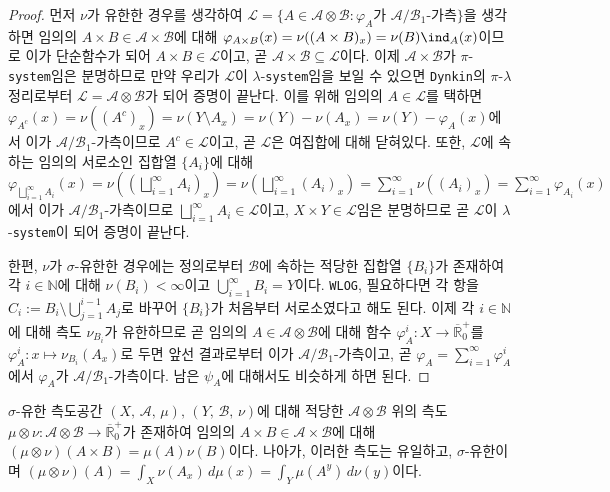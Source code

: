 \begin{proof}
    먼저 $\nu$가 유한한 경우를 생각하여 $\mathcal{L}=\{A\in\mathcal{A}\otimes\mathcal{B}:\varphi_A\textrm{가 $\mathcal{A}/\mathcal{B}_1$-가측}\}$을 생각하면 임의의 $A\times B\in\mathcal{A}\times\mathcal{B}$에 대해 $\varphi_{A\times B}(x)=\nu((A\times B)_x)=\nu(B)\ind_A(x)$이므로 이가 단순함수가 되어 $A\times B\in\mathcal{L}$이고, 곧 $\mathcal{A}\times\mathcal{B}\subseteq\mathcal{L}$이다. 이제 $\mathcal{A}\times\mathcal{B}$가 $\pi$-\texttt{system}임은 분명하므로 만약 우리가 $\mathcal{L}$이 $\lambda$-\texttt{system}임을 보일 수 있으면 \texttt{Dynkin}의 $\pi$-$\lambda$ 정리로부터 $\mathcal{L}=\mathcal{A}\otimes\mathcal{B}$가 되어 증명이 끝난다. 이를 위해 임의의 $A\in\mathcal{L}$를 택하면 $\varphi_{A^c}(x)=\nu((A^c)_x)=\nu(Y\setminus A_x)=\nu(Y)-\nu(A_x)=\nu(Y)-\varphi_A(x)$에서 이가 $\mathcal{A}/\mathcal{B}_1$-가측이므로 $A^c\in\mathcal{L}$이고, 곧 $\mathcal{L}$은 여집합에 대해 닫혀있다. 또한, $\mathcal{L}$에 속하는 임의의 서로소인 집합열 $\{A_i\}$에 대해 $\varphi_{\bigsqcup_{i=1}^\infty A_i}(x)=\nu((\bigsqcup_{i=1}^\infty A_i)_x)=\nu(\bigsqcup_{i=1}^\infty(A_i)_x)=\sum_{i=1}^\infty\nu((A_i)_x)=\sum_{i=1}^\infty\varphi_{A_i}(x)$에서 이가 $\mathcal{A}/\mathcal{B}_1$-가측이므로 $\bigsqcup_{i=1}^\infty A_i\in\mathcal{L}$이고, $X\times Y\in\mathcal{L}$임은 분명하므로 곧 $\mathcal{L}$이 $\lambda$-\texttt{system}이 되어 증명이 끝난다.

    한편, $\nu$가 $\sigma$-유한한 경우에는 정의로부터 $\mathcal{B}$에 속하는 적당한 집합열 $\{B_i\}$가 존재하여 각 $i\in\mathbb{N}$에 대해 $\nu(B_i)<\infty$이고 $\bigcup_{i=1}^\infty B_i=Y$이다. \texttt{WLOG}, 필요하다면 각 항을 $C_i:=B_i\setminus\bigcup_{j=1}^{i-1}A_j$로 바꾸어 $\{B_i\}$가 처음부터 서로소였다고 해도 된다. 이제 각 $i\in\mathbb{N}$에 대해 측도 $\nu_{B_i}$가 유한하므로 곧 임의의 $A\in\mathcal{A}\otimes\mathcal{B}$에 대해 함수 $\varphi_A^i:X\to\overline{\mathbb{R}}^+_0$를 $\varphi_A^i:x\mapsto\nu_{B_i}(A_x)$로 두면 앞선 결과로부터 이가 $\mathcal{A}/\mathcal{B}_1$-가측이고, 곧 $\varphi_A=\sum_{i=1}^\infty \varphi_A^i$에서 $\varphi_A$가 $\mathcal{A}/\mathcal{B}_1$-가측이다. 남은 $\psi_A$에 대해서도 비슷하게 하면 된다.
\end{proof}

\begin{theorem}\label{thm:productMeasure}
    $\sigma$-유한 측도공간 $(X,\,\mathcal{A},\,\mu),\,(Y,\,\mathcal{B},\,\nu)$에 대해 적당한 $\mathcal{A}\otimes\mathcal{B}$ 위의 측도 $\mu\otimes\nu:\mathcal{A}\otimes\mathcal{B}\to\overline{\mathbb{R}}^+_0$가 존재하여 임의의 $A\times B\in\mathcal{A}\times\mathcal{B}$에 대해 $(\mu\otimes\nu)(A\times B)=\mu(A)\nu(B)$이다. 나아가, 이러한 측도는 유일하고, $\sigma$-유한이며 $(\mu\otimes\nu)(A)=\int_X\nu(A_x)\,d\mu(x)=\int_Y\mu(A^y)\,d\nu(y)$이다.
 \end{theorem}


